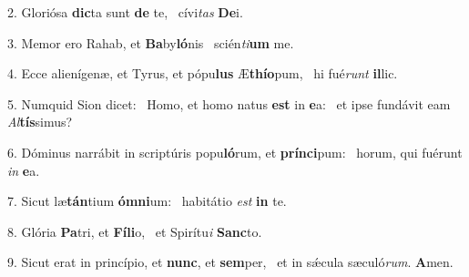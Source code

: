 2. Gloriósa \textbf{dic}ta sunt \textbf{de} te, \ast\  cívi\textit{tas} \textbf{De}i.\

3. Memor ero Rahab, et \textbf{Ba}by\textbf{ló}nis \ast\  scién\textit{ti}\textbf{um} me.\

4. Ecce alienígenæ, et Tyrus, et pópu\textbf{lus} Æ\textbf{thí}\textbf{o}pum, \ast\  hi fué\textit{runt} \textbf{il}lic.\

5. Numquid Sion dicet: \dag\  Homo, et homo natus \textbf{est} in \textbf{e}a: \ast\  et ipse fundávit eam \textit{Al}\textbf{tís}simus?\

6. Dóminus narrábit in scriptúris popu\textbf{ló}rum, et \textbf{prín}\textbf{ci}pum: \ast\  horum, qui fuérunt \textit{in} \textbf{e}a.\

7. Sicut læ\textbf{tán}tium \textbf{óm}\textbf{ni}um: \ast\  habitátio \textit{est} \textbf{in} te.\

8. Glória \textbf{Pa}tri, et \textbf{Fí}\textbf{li}o, \ast\  et Spirítu\textit{i} \textbf{Sanc}to.\

9. Sicut erat in princípio, et \textbf{nunc}, et \textbf{sem}per, \ast\  et in sǽcula sæculó\textit{rum}. \textbf{A}men.\

